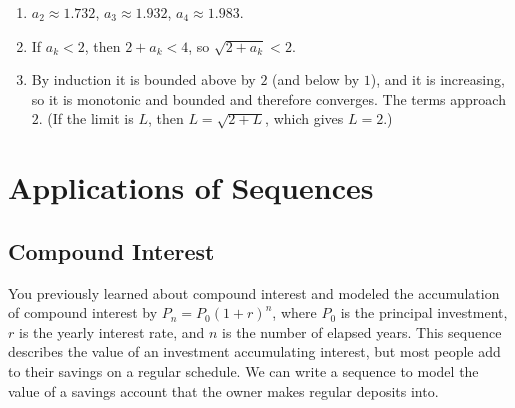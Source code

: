 \begin{Answer}[ref=seqcalc4]
    \begin{enumerate}
        \item $a_2 \approx 1.732$, $a_3 \approx 1.932$, $a_4 \approx 1.983$.
        \item If $a_k < 2$, then $2 + a_k < 4$, so $\sqrt{2 + a_k} < 2$.
        \item By induction it is bounded above by $2$ (and below by $1$), and
        it is increasing, so it is monotonic and bounded and therefore
        converges. The terms approach $2$. (If the limit is $L$, then
        $L = \sqrt{2 + L}$, which gives $L = 2$.)
    \end{enumerate}
\end{Answer}

\section{Applications of Sequences}
\subsection{Compound Interest}
You previously learned about compound interest and modeled the accumulation of
compound interest by $P_n = P_0(1 + r)^n$, where $P_0$ is the principal
investment, $r$ is the yearly interest rate, and $n$ is the number of elapsed
years. This sequence describes the value of an investment accumulating
interest, but most people add to their savings on a regular schedule. We can
write a sequence to model the value of a savings account that the owner makes
regular deposits into.

